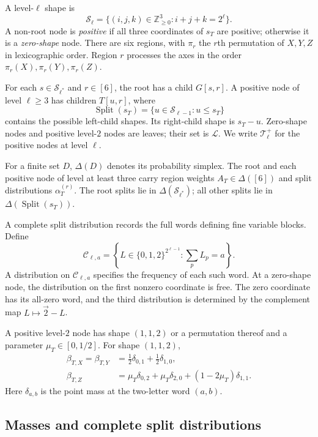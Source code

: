 \documentclass[11pt,a4paper]{article}
\newcommand{\Shapes}{\mathcal S}
\DeclareMathOperator{\Split}{Split}
\newcommand{\Tpos}[1]{\mathcal T_{#1}^{+}}
\newcommand{\ZZ}{\mathbb Z}
\begin{document}
A level-$\ell$ shape is
\[
\Shapes_\ell=\{(i,j,k)\in\ZZ_{\ge0}^3:i+j+k=2^\ell\}.
\]
A non-root node is \emph{positive} if all three coordinates of $s_T$ are positive; otherwise it is a \emph{zero-shape} node. There are six regions, with $\pi_r$ the $r$th permutation of $X,Y,Z$ in lexicographic order. Region $r$ processes the axes in the order $\pi_r(X),\pi_r(Y),\pi_r(Z)$.

For each $s\in\Shapes_{\ell^*}$ and $r\in[6]$, the root has a child $G[s,r]$. A positive node of level $\ell\ge3$ has children $T[u,r]$, where
\begin{equation}\label{eq:split}
\Split(s_T)=\{u\in\Shapes_{\ell-1}:u\le s_T\}
\end{equation}
contains the possible left-child shapes. Its right-child shape is $s_T-u$. Zero-shape nodes and positive level-$2$ nodes are leaves; their set is $\mathcal L$. We write $\Tpos\ell$ for the positive nodes at level $\ell$.

For a finite set $D$, $\Delta(D)$ denotes its probability simplex. The root and each positive node of level at least three carry region weights $A_T\in\Delta([6])$ and split distributions $\alpha_T^{(r)}$. The root splits lie in $\Delta(\Shapes_{\ell^*})$; all other splits lie in $\Delta(\Split(s_T))$.

A complete split distribution records the full words defining fine variable blocks. Define
\[
\mathcal C_{\ell,a}=\left\{L\in\{0,1,2\}^{2^{\ell-1}}:\sum_pL_p=a\right\}.
\]
A distribution on $\mathcal C_{\ell,a}$ specifies the frequency of each such word. At a zero-shape node, the distribution on the first nonzero coordinate is free. The zero coordinate has its all-zero word, and the third distribution is determined by the complement map $L\mapsto\vec2-L$.

A positive level-$2$ node has shape $(1,1,2)$ or a permutation thereof and a parameter $\mu_T\in[0,1/2]$. For shape $(1,1,2)$,
\begin{equation}\label{eq:leveltwo-beta}
\begin{aligned}
\beta_{T,X}=\beta_{T,Y}&=\tfrac12\delta_{0,1}+\tfrac12\delta_{1,0},\\
\beta_{T,Z}&=\mu_T\delta_{0,2}+\mu_T\delta_{2,0}+(1-2\mu_T)\delta_{1,1}.
\end{aligned}
\end{equation}
Here $\delta_{a,b}$ is the point mass at the two-letter word $(a,b)$.

\subsection{Masses and complete split distributions}
\end{document}
